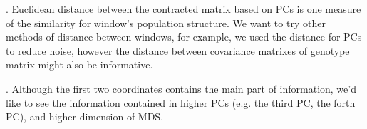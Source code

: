 \documentclass[11pt, oneside]{article}   	%
\begin{document}
. Euclidean distance between the contracted matrix based on PCs is one measure of the similarity for window's population structure.
We want to try other methods of distance between windows, for example, we used the distance for PCs to reduce noise, however the distance between covariance matrixes of genotype matrix might also be informative.

. Although the first two coordinates contains the main part of information, we'd like to see the information contained in higher PCs (e.g. the third PC, the forth PC), and higher dimension of MDS.


  
\end{document}
